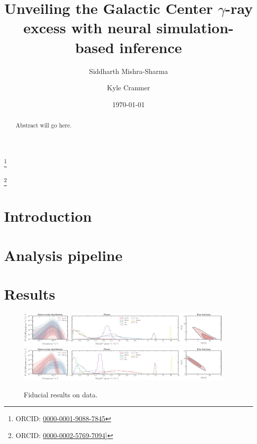 \documentclass[prd,aps,10pt,nofootinbib,twocolumn,superscriptaddress,preprintnumbers,balancelastpage,longbibliography]{revtex4-1}
\begin{document}
\title{Unveiling the Galactic Center $\gamma$-ray excess with neural simulation-based inference}
 
\author{Siddharth Mishra-Sharma}
\thanks{ORCID: \href{https://orcid.org/0000-0001-9088-7845}{0000-0001-9088-7845}}

\author{Kyle Cranmer}
\thanks{ORCID: \href{https://orcid.org/0000-0002-5769-7094]}{0000-0002-5769-7094]}}

\date{\today}

\begin{abstract}
Abstract will go here.
\end{abstract}

\maketitle

\section{Introduction}
\label{sec:intro}

\section{Analysis pipeline}
\label{sec:analysis}

\section{Results}
\label{sec:results}


%
\begin{figure}
    \centering
    \includegraphics[width=0.95\textwidth]{plots/data_fid_sbi.pdf}
    \includegraphics[width=0.95\textwidth]{plots/data_fid_nptf.pdf}
    \caption{Fiducial results on data.}
    \label{fig:fid_data}
\end{figure}
%
\end{document}
